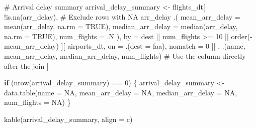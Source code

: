 \documentclass[
  12pt,
]{article}
\newenvironment{Shaded}{\begin{snugshade}}{\end{snugshade}}
\newcommand{\AttributeTok}[1]{\textcolor[rgb]{0.40,0.45,0.13}{#1}}
\newcommand{\CommentTok}[1]{\textcolor[rgb]{0.37,0.37,0.37}{#1}}
\newcommand{\ConstantTok}[1]{\textcolor[rgb]{0.56,0.35,0.01}{#1}}
\newcommand{\ControlFlowTok}[1]{\textcolor[rgb]{0.00,0.23,0.31}{\textbf{#1}}}
\newcommand{\DecValTok}[1]{\textcolor[rgb]{0.68,0.00,0.00}{#1}}
\newcommand{\FunctionTok}[1]{\textcolor[rgb]{0.28,0.35,0.67}{#1}}
\newcommand{\NormalTok}[1]{\textcolor[rgb]{0.00,0.23,0.31}{#1}}
\newcommand{\OtherTok}[1]{\textcolor[rgb]{0.00,0.23,0.31}{#1}}
\newcommand{\SpecialCharTok}[1]{\textcolor[rgb]{0.37,0.37,0.37}{#1}}
\newcommand{\StringTok}[1]{\textcolor[rgb]{0.13,0.47,0.30}{#1}}
\begin{document}
\begin{Shaded}
\begin{Highlighting}[]
\CommentTok{\# Arrival delay summary}
\NormalTok{arrival\_delay\_summary }\OtherTok{\textless{}{-}}\NormalTok{ flights\_dt[}
  \SpecialCharTok{!}\FunctionTok{is.na}\NormalTok{(arr\_delay), }\CommentTok{\# Exclude rows with NA arr\_delay}
\NormalTok{  .(}
    \AttributeTok{mean\_arr\_delay =} \FunctionTok{mean}\NormalTok{(arr\_delay, }\AttributeTok{na.rm =} \ConstantTok{TRUE}\NormalTok{),}
    \AttributeTok{median\_arr\_delay =} \FunctionTok{median}\NormalTok{(arr\_delay, }\AttributeTok{na.rm =} \ConstantTok{TRUE}\NormalTok{),}
    \AttributeTok{num\_flights =}\NormalTok{ .N}
\NormalTok{  ), by }\OtherTok{=}\NormalTok{ dest}
\NormalTok{][}
\NormalTok{  num\_flights }\SpecialCharTok{\textgreater{}=} \DecValTok{10}
\NormalTok{][}
  \FunctionTok{order}\NormalTok{(}\SpecialCharTok{{-}}\NormalTok{mean\_arr\_delay)}
\NormalTok{][}
\NormalTok{  airports\_dt, on }\OtherTok{=}\NormalTok{ .(}\AttributeTok{dest =}\NormalTok{ faa), nomatch }\OtherTok{=} \DecValTok{0}
\NormalTok{][}
\NormalTok{  , .(name, mean\_arr\_delay, median\_arr\_delay, num\_flights) }\CommentTok{\# Use the column directly after the join}
\NormalTok{]}

\ControlFlowTok{if}\NormalTok{ (}\FunctionTok{nrow}\NormalTok{(arrival\_delay\_summary) }\SpecialCharTok{==} \DecValTok{0}\NormalTok{) \{}
\NormalTok{  arrival\_delay\_summary }\OtherTok{\textless{}{-}} \FunctionTok{data.table}\NormalTok{(}\AttributeTok{name =} \ConstantTok{NA}\NormalTok{, }\AttributeTok{mean\_arr\_delay =} \ConstantTok{NA}\NormalTok{, }\AttributeTok{median\_arr\_delay =} \ConstantTok{NA}\NormalTok{, }\AttributeTok{num\_flights =} \ConstantTok{NA}\NormalTok{)}
\NormalTok{\}}

\FunctionTok{kable}\NormalTok{(arrival\_delay\_summary, }\AttributeTok{align =} \StringTok{\textquotesingle{}c\textquotesingle{}}\NormalTok{)}
\end{Highlighting}
\end{Shaded}
\end{document}
